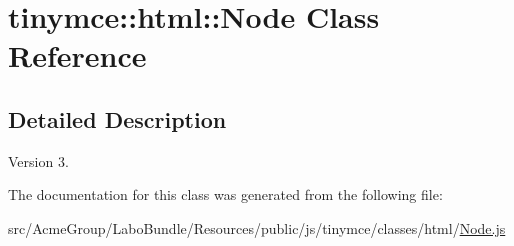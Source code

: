 \hypertarget{classtinymce_1_1html_1_1_node}{\section{tinymce\+:\+:html\+:\+:Node Class Reference}
\label{classtinymce_1_1html_1_1_node}
}


\subsection{Detailed Description}
\begin{DoxyVersion}{Version}
3. 
\end{DoxyVersion}


The documentation for this class was generated from the following file\+:\begin{DoxyCompactItemize}
\item 
src/\+Acme\+Group/\+Labo\+Bundle/\+Resources/public/js/tinymce/classes/html/\hyperlink{_node_8js}{Node.\+js}\end{DoxyCompactItemize}
